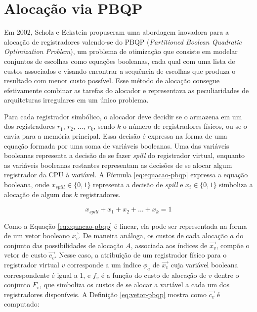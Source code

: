 \documentclass[
	12pt,				%
	openright,			%
	twoside,			%
	a4paper,			%
	tcc,			%
	]{ABNT-DC-UEL}
\begin{document}
\section{Alocação via PBQP}

Em 2002, Scholz e Eckstein \cite{scholz:02} propuseram uma abordagem inovadora para a alocação de registradores valendo-se do PBQP (\textit{Partitioned Boolean Quadratic Optimization Problem}), um problema de otimização que consiste em modelar conjuntos de escolhas como equações booleanas, cada qual com uma lista de custos associados e visando encontrar a sequência de escolhas que produza o resultado com menor custo possível. Esse método de alocação consegue efetivamente combinar as tarefas do alocador e representava as peculiaridades de arquiteturas irregulares em um único problema.

Para cada registrador simbólico, o alocador deve decidir se o armazena em um dos registradores $r_1$, $r_2$, $\ldots$, $r_k$, sendo $k$ o número de registradores físicos, ou se o envia para a memória principal. Essa decisão é expressa na forma de uma equação formada por uma soma de variáveis booleanas. Uma das variáveis booleanas representa a decisão de se fazer \textit{spill} do registrador virtual, enquanto as variáveis booleanas restantes representam as decisões de se alocar algum registrador da CPU à variável. A Fórmula \ref{eq:equacao-pbqp} expressa a equação booleana, onde $x_{\mathit{spill}}\in \{0,1\}$ representa a decisão de \textit{spill} e $x_{i}\in \{0,1\}$ simboliza a alocação de algum dos $k$ registradores.

\begin{equation}
    x_{\mathit{spill}} + x_{1} + x_{2} + \ldots + x_{k} = 1
    \label{eq:equacao-pbqp}
\end{equation}

Como a Equação \ref{eq:equacao-pbqp} é linear, ela pode ser representada na forma de um vetor booleano $\Vec{x_v}$. De maneira análoga, os custos de cada alocação $a$ do conjunto das possibilidades de alocação $A$, associada aos índices de $\Vec{x_v}$, compõe o vetor de custo $\Vec{c_v}$. Nesse caso, a atribuição de um registrador físico para o registrador virtual $v$ corresponde a um índice $\phi_a$ de $\Vec{x_v}$ cuja variável booleana correspondente é igual a 1, e $f_v$ é a função do custo de alocação de $v$ dentre o conjunto $F_v$, que simboliza os custos de se alocar a variável a cada um dos registradores disponíveis. A Definição \ref{eq:vetor-pbqp} mostra como $\Vec{c_v}$ é computado:
\end{document}
